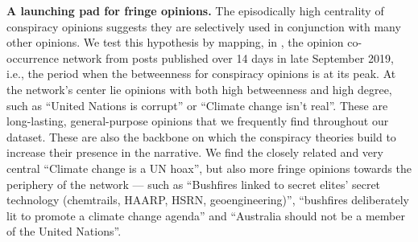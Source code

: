 \textbf{A launching pad for fringe opinions.}
The episodically high centrality of conspiracy opinions suggests they are selectively used in conjunction with many other opinions.
We test this hypothesis by mapping, in , the opinion co-occurrence network from posts published over 14 days in late September 2019, i.e., the period when the betweenness for conspiracy opinions is at its peak.
At the network's center lie opinions with both high betweenness and high degree, such as ``United Nations is corrupt'' or ``Climate change isn't real''.
These are long-lasting, general-purpose opinions that we frequently find throughout our dataset.
These are also the backbone on which the conspiracy theories build to increase their presence in the narrative.
We find the closely related and very central ``Climate change is a UN hoax'', but also more fringe opinions towards the periphery of the network --- such as 
``Bushfires linked to secret elites' secret technology (chemtrails, HAARP, HSRN, geoengineering)'', 
``bushfires deliberately lit to promote a climate change agenda'' and 
``Australia should not be a member of the United Nations''.






